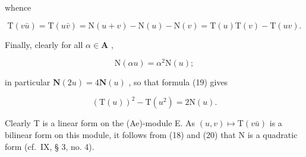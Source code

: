 whence

\[
\mathrm{T} (v \bar {u}) = \mathrm{T} (u \bar {v}) = \mathrm{N} (u + v) - \mathrm{N} (u) - \mathrm{N} (v) = \mathrm{T} (u) \mathrm{T} (v) - \mathrm{T} (u v).\tag{19}
\]

Finally, clearly for all \(\alpha \in \mathbf{A}\) ,

\[
\mathrm{N} (\alpha u) = \alpha^ {2} \mathrm{N} (u);\tag{20}
\]

in particular \(\mathbf{N}(2u) = 4\mathbf{N}(u)\) , so that formula (19) gives

\[
(\mathrm{T} (u)) ^ {2} - \mathrm{T} (u ^ {2}) = 2 \mathrm{N} (u).\tag{21}
\]

Clearly T is a linear form on the (Ae)-module E. As \((u, v) \mapsto \mathrm{T}(v\bar{u})\) is a bilinear form on this module, it follows from (18) and (20) that N is a quadratic form (cf.~IX, § 3, no. 4).

